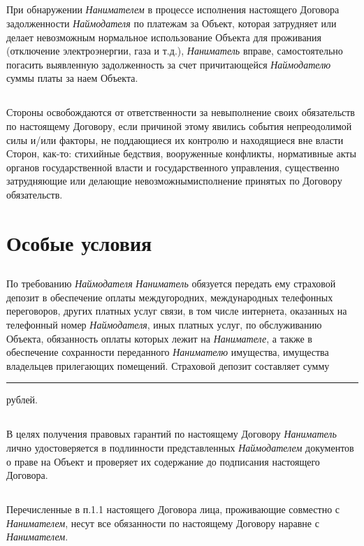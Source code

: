 \documentclass[a4paper, 11pt]{article}
\begin{document}
\subsection{} При обнаружении \textit{Нанимателем} в процессе исполнения настоящего Договора
задолженности \textit{Наймодателя} по платежам за Объект, которая затрудняет или делает
невозможным нормальное использование Объекта для проживания (отключение
электроэнергии, газа и т.д.), \textit{Наниматель} вправе, самостоятельно погасить
выявленную задолженность за счет причитающейся \textit{Наймодателю} суммы платы за наем
Объекта.
\subsection{} Стороны освобождаются от ответственности за невыполнение своих обязательств
по настоящему Договору, если причиной этому явились события непреодолимой силы
и/или факторы, не поддающиеся их контролю и находящиеся вне власти Сторон,
как-то: стихийные бедствия, вооруженные конфликты, нормативные акты органов
государственной власти и государственного управления, существенно затрудняющие
или делающие невозможнымисполнение принятых по Договору обязательств.
\section{Особые условия}
\subsection{} По требованию \textit{Наймодателя} \textit{Наниматель} обязуется передать ему страховой
депозит в обеспечение оплаты междугородних, международных телефонных
переговоров, других платных услуг связи, в том числе интернета, оказанных на
телефонный номер \textit{Наймодателя}, иных платных услуг, по обслуживанию Объекта,
обязанность оплаты которых лежит на \textit{Нанимателе}, а также в обеспечение
сохранности переданного \textit{Нанимателю} имущества, имущества владельцев прилегающих
помещений. Страховой депозит составляет сумму \rule{4cm}{0.5pt} рублей.
\subsection{} В целях получения правовых гарантий по настоящему Договору \textit{Наниматель} лично
удостоверяется в подлинности представленных \textit{Наймодателем} документов о праве на
Объект и проверяет их содержание до подписания настоящего Договора.
\subsection{} Перечисленные в п.1.1 настоящего Договора лица, проживающие совместно с
\textit{Нанимателем}, несут все обязанности по настоящему Договору наравне с
\textit{Нанимателем}.
\end{document}
